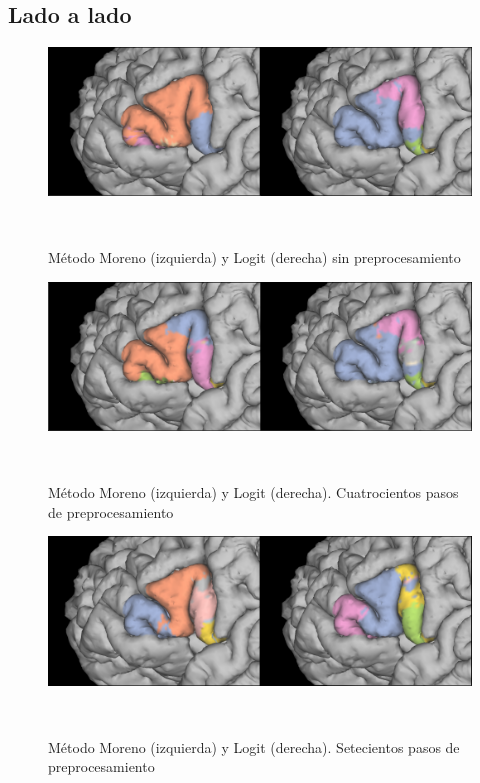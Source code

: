 \subsection{Lado a lado}


\begin{figure}[h]

\begin{minipage}[h]{\textwidth}
    \includegraphics[width=\textwidth]{img/broca/vs_0.png}
    \caption{M\'etodo Moreno (izquierda) y Logit (derecha) sin preprocesamiento}
\end{minipage} ~

\end{figure}

\begin{figure}[h]                  

\begin{minipage}[h]{\textwidth}
    \includegraphics[width=\textwidth]{img/broca/vs_400.png}
    \caption{M\'etodo Moreno (izquierda) y Logit (derecha). Cuatrocientos pasos de preprocesamiento}
\end{minipage} ~

\end{figure}

\begin{figure}[h]

\begin{minipage}[h]{\textwidth}
    \includegraphics[width=\textwidth]{img/broca/vs_700.png}
    \caption{M\'etodo Moreno (izquierda) y Logit (derecha). Setecientos pasos de preprocesamiento}

\end{minipage} ~

\end{figure}
 
